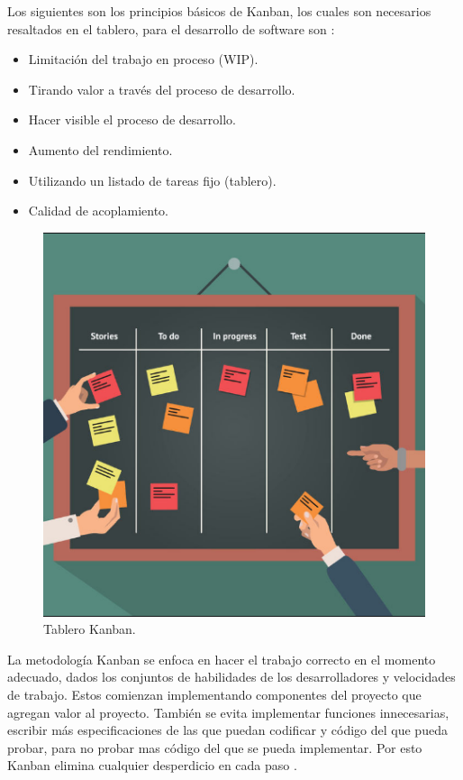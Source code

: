 \par Los siguientes son los principios básicos de Kanban, los cuales son necesarios resaltados en el tablero, para el desarrollo de software son \cite{LIB23}:
\begin{itemize}
    \item Limitación del trabajo en proceso (WIP).
    \item Tirando valor a través del proceso de desarrollo.
    \item Hacer visible el proceso de desarrollo.
    \item Aumento del rendimiento.
    \item Utilizando un listado de tareas fijo (tablero).
    \item Calidad de acoplamiento.
\end{itemize}

\begin{figure}[htpb!]
	\centering
	\includegraphics[width=0.875\columnwidth]{images/kanban01.PNG}
	\caption{Tablero Kanban.}
	\label{fig:kanban01}
\end{figure}

\par La metodología Kanban se enfoca en hacer el trabajo correcto en el momento adecuado, dados los conjuntos de habilidades de los desarrolladores y velocidades de trabajo. Estos comienzan implementando componentes del proyecto que agregan valor al proyecto. También se evita implementar funciones innecesarias, escribir más especificaciones de las que puedan codificar y  código del que pueda probar, para no probar mas código del que se pueda implementar. Por esto Kanban elimina cualquier desperdicio en cada paso \cite{LIB23}.
